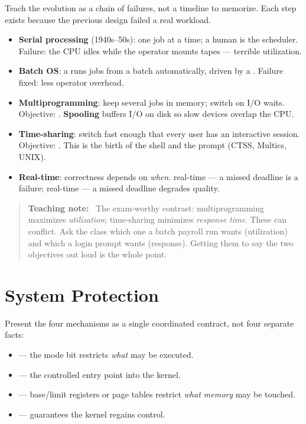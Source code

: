 \documentclass[11pt]{article}
\newenvironment{teachingaside}{\begin{quote}\small\color{primary-gold}\textbf{Teaching note:}\ }{\end{quote}}
\begin{document}
Teach the evolution as a chain of failures, not a timeline to memorize. Each step exists because the previous design failed a real workload.

\begin{itemize}
  \item \textbf{Serial processing} (1940s--50s): one job at a time; a human is the scheduler. Failure: the CPU idles while the operator mounts tapes --- terrible utilization.
  \item \textbf{Batch OS}: a  runs jobs from a batch automatically, driven by a . Failure fixed: less operator overhead.
  \item \textbf{Multiprogramming}: keep several jobs in memory; switch on I/O waits. Objective: . \textbf{Spooling} buffers I/O on disk so slow devices overlap the CPU.
  \item \textbf{Time-sharing}: switch fast enough that every user has an interactive session. Objective: . This is the birth of the shell and the prompt (CTSS, Multics, UNIX).
  \item \textbf{Real-time}: correctness depends on \emph{when}.  real-time --- a missed deadline is a failure;  real-time --- a missed deadline degrades quality.
\end{itemize}

\begin{teachingaside}
The exam-worthy contrast: multiprogramming maximizes \emph{utilization}; time-sharing minimizes \emph{response time}. These can conflict. Ask the class which one a batch payroll run wants (utilization) and which a login prompt wants (response). Getting them to say the two objectives out loud is the whole point.
\end{teachingaside}

\section{System Protection}

Present the four mechanisms as a single coordinated contract, not four separate facts:

\begin{itemize}
  \item {} --- the mode bit restricts \emph{what} may be executed.
  \item {} --- the controlled entry point into the kernel.
  \item {} --- base/limit registers or page tables restrict \emph{what memory} may be touched.
  \item {} --- guarantees the kernel regains control.
\end{itemize}
\end{document}
